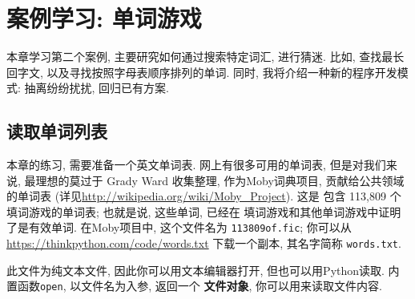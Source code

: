 \documentclass[10pt]{book}
\begin{document}
\chapter{案例学习: 单词游戏}
\label{wordplay}

本章学习第二个案例, 主要研究如何通过搜索特定词汇, 进行猜迷. 
比如, 查找最长回字文, 以及寻找按照字母表顺序排列的单词. 
同时, 我将介绍一种新的程序开发模式: 抽离纷纷扰扰, 回归已有方案. 


\section{读取单词列表}
\label{wordlist}
本章的练习, 需要准备一个英文单词表. 
网上有很多可用的单词表, 但是对我们来说, 最理想的莫过于
Grady Ward 收集整理, 作为Moby词典项目, 贡献给公共领域的单词表
(详见\url{http://wikipedia.org/wiki/Moby_Project}). 这是
包含 113,809 个填词游戏的单词表; 也就是说, 这些单词, 已经在
填词游戏和其他单词游戏中证明了是有效单词. 
在Moby项目中, 这个文件名为 {\tt 113809of.fic};
你可以从\url{https://thinkpython.com/code/words.txt} 下载一个副本, 
其名字简称 {\tt words.txt}. 

此文件为纯文本文件, 因此你可以用文本编辑器打开, 
但也可以用Python读取. 
内置函数{\tt open}, 以文件名为入参, 返回一个 {\bf 文件对象}, 
你可以用来读取文件内容. 
\end{document}
